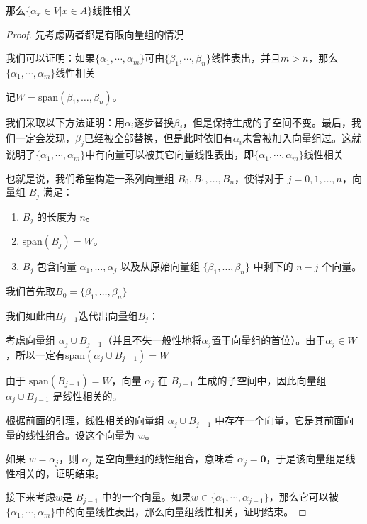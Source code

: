 \documentclass[12pt, a4paper, oneside, UTF8]{ctexbook}
\begin{document}
\begin{para}{0}
\begin{proposition}
						那么$\{\alpha_x \in V| x \in A\}$线性相关
					\end{proposition}
					\begin{proof}
						先考虑两者都是有限向量组的情况

						我们可以证明：如果$\{\alpha_1,\cdots,\alpha_m\}$可由$\{\beta_1,\cdots,\beta_n\}$线性表出，并且$m > n$，那么$\{\alpha_1,\cdots,\alpha_m\}$线性相关

						记$W=\text{span}(\beta _1, \dots, \beta _n)$。

						我们采取以下方法证明：用$\alpha_i$逐步替换$\beta_j$，但是保持生成的子空间不变。最后，我们一定会发现，$\beta_j$已经被全部替换，但是此时依旧有$\alpha_i$未曾被加入向量组过。这就说明了$\{\alpha_1,\cdots,\alpha_m\}$中有向量可以被其它向量线性表出，即$\{\alpha_1,\cdots,\alpha_m\}$线性相关
						
						也就是说，我们希望构造一系列向量组 $B_0, B_1, \dots, B_n$，使得对于 $j=0, 1, \dots, n$，向量组 $B_j$ 满足：
						\begin{enumerate}
							\item $B_j$ 的长度为 $n$。
							\item $\text{span}(B_j) = W$。
							\item $B_j$ 包含向量 $\alpha _1, \dots, \alpha _j$ 以及从原始向量组 $\{\beta _1, \dots, \beta _n\}$ 中剩下的 $n-j$ 个向量。
						\end{enumerate}
						
						我们首先取$B_0 = \{\beta _1, \dots, \beta _n\}$

						我们如此由$B_{j-1}$迭代出向量组$B_j$：

						考虑向量组 $\alpha_j \cup B_{j-1}$（并且不失一般性地将$\alpha_j$置于向量组的首位）。由于$\alpha_j \in W$，所以一定有$\text{span}(\alpha_j \cup B_{j-1})=W$
						
						由于 $\text{span}(B_{j-1})=W$，向量 $\alpha _j$ 在 $B_{j-1}$ 生成的子空间中，因此向量组 $\alpha _j\cup B_{j-1}$ 是线性相关的。

						根据前面的引理，线性相关的向量组 $\alpha_j\cup B_{j-1}$ 中存在一个向量，它是其前面向量的线性组合。设这个向量为 $w$。
						
						如果 $w = \alpha_j$，则 $\alpha_j$ 是空向量组的线性组合，意味着 $\alpha_j = \mathbf{0}$，于是该向量组是线性相关的，证明结束。

						接下来考虑$w$是 $B_{j-1}$ 中的一个向量。如果$w \in \{\alpha_1,\cdots,\alpha_{j-1}\}$，那么它可以被$\{\alpha_1,\cdots,\alpha_m\}$中的向量线性表出，那么向量组线性相关，证明结束。


\end{proof}
\end{para}
\end{document}
